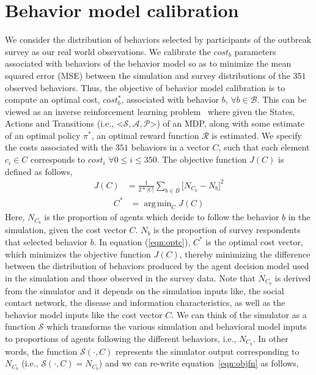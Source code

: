 \documentclass[doublespace,draft]{VTthesis}
\DeclareMathOperator*{\argmin}{arg\,min}
\begin{document}
    \section{Behavior model calibration}
    We consider the distribution of behaviors selected by participants of the outbreak survey as our real world observations. We calibrate the $cost_b$ parameters associated with behaviors of the behavior model so as to minimize the mean squared error (MSE) between the simulation and survey distributions of the $351$ observed behaviors. Thus, the objective of behavior model calibration is to compute an optimal cost, $cost_b^*$, associated with behavior $b$, $\forall b \in \mathcal{B}$. This can be viewed as an inverse reinforcement learning problem~\cite{ng2000algorithms} where given the States, Actions and Transitions (i.e., \big<$\mathcal{S,A,P}$\big>) of an MDP, along with some estimate of an optimal policy $\pi^*$, an optimal reward function $\mathcal{R}$ is estimated. We specify the costs associated with the $351$ behaviors in a vector $C$, such that each element $c_i \in C$ corresponds to $cost_i$ $\forall 0 \le i \le 350$. The objective function $J(C)$ is defined as follows,
    \begin{align}
        J(C) &= \frac{1}{2 * |C|} \sum_{b \in B}\bigg[ N_{C_b} - N_{b} \bigg]^2
    		\label{eqn:objfn}
    \end{align}
    \begin{align}
    		C^* &= \argmin_C J(C) 
    		\label{eqn:optc}
    \end{align}
    Here, $N_{C_b}$ is the proportion of agents which decide to follow the behavior $b$ in the simulation, given the cost vector $C$. $N_{b}$ is the proportion of survey respondents that selected behavior $b$. In equation (\ref{eqn:optc}), $C^*$ is the optimal cost vector, which minimizes the objective function $J(C)$, thereby minimizing the difference between the distribution of behaviors produced by the agent decision model used in the simulation and those observed in the survey data. Note that $N_{C_b}$ is derived from the simulator and it depends on the simulation inputs like, the social contact network, the disease and information characteristics, as well as the behavior model inputs like the cost vector $C$. We can think of the simulator as a function $\mathscr{S}$ which transforms the various simulation and behavioral model inputs to proportions of agents following the different behaviors, i.e., $N_{C_b}$. In other words, the function $\mathscr{S}(\cdot, C)$ represents the simulator output corresponding to $N_{C_b}$ (i.e., $\mathscr{S}(\cdot, C) = N_{C_b}$) and we can re-write equation~\ref{eqn:objfn} as follows,
\end{document}
